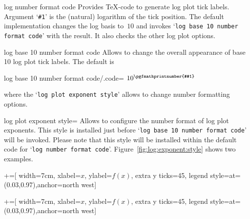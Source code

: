 \begin{pgfplotscodekey}{log number format code}
Provides \TeX-code to generate log plot tick labels. Argument `\texttt{\#1}' is the (natural) logarithm of the tick position.
The default implementation changes the log basis to~$10$ and invokes `\texttt{log base 10 number format code}' with the result. It also checks the other log plot options.
\end{pgfplotscodekey}


\begin{pgfplotscodekey}{log base 10 number format code}
Allows to change the overall appearance of base 10 log plot tick labels. The default is
\begin{codeexample}
log base 10 number format code/.code={%
	$10^{\pgfmathprintnumber{#1}}$}
\end{codeexample}
where the `\texttt{log plot exponent style}' allows to change number formatting options.
\end{pgfplotscodekey}

\begin{pgfplotskey}{log plot exponent style=}
Allows to configure the number format of log plot exponents. This style is installed just before `\texttt{log base 10 number format code}' will be invoked. Please note that this style will be installed within the default code for `\texttt{log number format code}'. Figure~\ref{fig:log:exponent:style} shows two examples.
\begin{codeexample}[]
\tikzset{samples=15}%
+=[
		width=7cm,
		xlabel=$x$,
		ylabel=$f(x)$,
		extra y ticks={45},
		legend style={at={(0.03,0.97)},anchor=north west}]%
%
\end{codeexample}

\begin{codeexample}[]
\tikzset{samples=15}%
+=[
		width=7cm,
		xlabel=$x$,
		ylabel=$f(x)$,
		extra y ticks={45},
		legend style={at={(0.03,0.97)},anchor=north west}]%
%
\end{codeexample}
\end{pgfplotskey}

